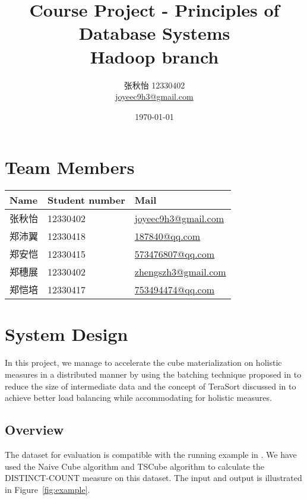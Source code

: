 \documentclass{article}
\begin{document}


\title{Course Project - Principles of Database Systems \\ Hadoop branch}
\author{张秋怡 12330402 \\ \href{mailto:joyeec9h3@gmail.com}{joyeec9h3@gmail.com}} 
\date{\today}
\maketitle

\tableofcontents
\section{Team Members}

\begin{table}[H]
\centering
\begin{tabular}{l l l}
Name              & Student number & Mail \\
\hline
张秋怡 & 12330402 &  \href{mailto:joyeec9h3@gmail.com}{joyeec9h3@gmail.com}  \\
郑沛翼 & 12330418 &  \href{mailto:187840@qq.com}{187840@qq.com}  \\
郑安恺 & 12330415 &  \href{mailto:573476807@qq.com}{573476807@qq.com}  \\
郑穗展 & 12330402 &  \href{mailto:zhengszh3@gmail.com}{zhengszh3@gmail.com}  \\
郑恺培 & 12330417 &  \href{mailto:753494474@qq.com}{753494474@qq.com}
\end{tabular}
\end{table}

\section{System Design}

In this project, we manage to accelerate the cube materialization on holistic measures in a distributed manner by using the batching technique proposed in \cite{nandi2012data} to reduce the size of intermediate data and the concept of TeraSort discussed in \cite{tao2013minimal} to achieve better load balancing while accommodating for holistic measures.

\subsection{Overview}

The dataset for evaluation is compatible with the running example in \cite{nandi2012data}. We have used the Naive Cube algorithm and TSCube algorithm to calculate the DISTINCT-COUNT measure on this dataset. The input and output is illustrated in Figure~\ref{fig:example}.
\end{document}
